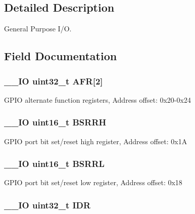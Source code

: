 \subsection{Detailed Description}
General Purpose I/\-O. 

\subsection{Field Documentation}
\hypertarget{struct_g_p_i_o___type_def_ab67c1158c04450d19ad483dcd2192e43}{
\subsubsection[{A\-F\-R}]{\setlength{\rightskip}{0pt plus 5cm}\-\_\-\-\_\-\-I\-O uint32\-\_\-t A\-F\-R\mbox{[}2\mbox{]}}}\label{struct_g_p_i_o___type_def_ab67c1158c04450d19ad483dcd2192e43}
G\-P\-I\-O alternate function registers, Address offset\-: 0x20-\/0x24 \hypertarget{struct_g_p_i_o___type_def_a35f89f65edca7ed58738166424aeef48}{
\subsubsection[{B\-S\-R\-R\-H}]{\setlength{\rightskip}{0pt plus 5cm}\-\_\-\-\_\-\-I\-O uint16\-\_\-t B\-S\-R\-R\-H}}\label{struct_g_p_i_o___type_def_a35f89f65edca7ed58738166424aeef48}
G\-P\-I\-O port bit set/reset high register, Address offset\-: 0x1\-A \hypertarget{struct_g_p_i_o___type_def_aa79204c9bcc8c481da0a5ffe7c74d8b0}{
\subsubsection[{B\-S\-R\-R\-L}]{\setlength{\rightskip}{0pt plus 5cm}\-\_\-\-\_\-\-I\-O uint16\-\_\-t B\-S\-R\-R\-L}}\label{struct_g_p_i_o___type_def_aa79204c9bcc8c481da0a5ffe7c74d8b0}
G\-P\-I\-O port bit set/reset low register, Address offset\-: 0x18 \hypertarget{struct_g_p_i_o___type_def_a328d2fe9ef1d513c3a97d30f98f0047c}{
\subsubsection[{I\-D\-R}]{\setlength{\rightskip}{0pt plus 5cm}\-\_\-\-\_\-\-I\-O uint32\-\_\-t I\-D\-R}}\label{struct_g_p_i_o___type_def_a328d2fe9ef1d513c3a97d30f98f0047c}

